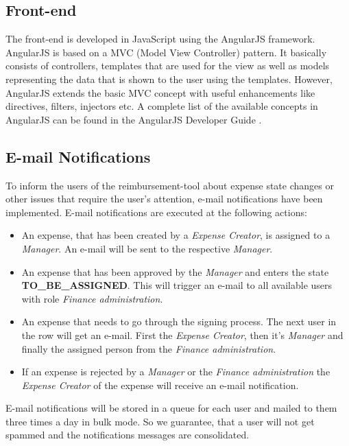 \subsection{Front-end}
The front-end is developed in JavaScript using the AngularJS framework\cite{angular}. AngularJS is based on a MVC (Model View Controller) pattern. It basically consists of controllers, templates that are used for the view  as well as models representing the data that is shown to the user using the templates. However, AngularJS  extends the basic MVC concept with useful enhancements like directives, filters, injectors etc. A complete list of the available concepts in AngularJS can be found in the AngularJS Developer Guide \cite{angular-devguide}.


\subsection{E-mail Notifications}
To inform the users of the reimbursement-tool about expense state changes or other issues that require the user's attention, e-mail notifications have been implemented. E-mail notifications are executed at the following actions:
\begin{itemize}
	\item An expense, that has been created by a \textit{Expense Creator}, is assigned to a \textit{Manager}. An e-mail will be sent to the respective \textit{Manager}.
	\item An expense that has been approved by the \textit{Manager} and enters the state \newline \textbf{TO\_BE\_ASSIGNED}. This will trigger an e-mail to all available users with role \textit{Finance administration}.
	\item An expense that needs to go through the signing process. The next user in the row will get an e-mail. First the \textit{Expense Creator}, then it's \textit{Manager} and finally the assigned person from the \textit{Finance administration}.
	\item If an expense is rejected by a \textit{Manager} or the \textit{Finance administration} the \textit{Expense Creator} of the expense will receive an e-mail notification.
\end{itemize}

E-mail notifications will be stored in a queue for each user and mailed to them three times a day in bulk mode. So we guarantee, that a user will not get spammed and the notifications messages are consolidated.

